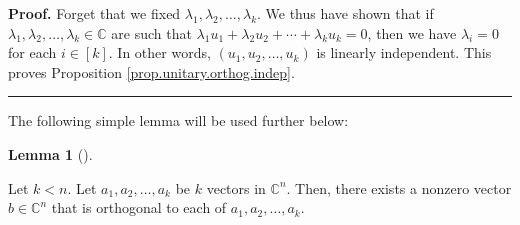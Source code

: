 \documentclass[numbers=enddot,12pt,final,onecolumn,notitlepage]{scrartcl}%
\numberwithin{exer}{subsection}
\theoremstyle{definition}
\newtheorem{lem}[theo]{Lemma}
\newenvironment{lemma}[1][]
{\begin{lem}[#1]\begin{leftbar}}
{\end{leftbar}\end{lem}}
\newenvironment{proof}[1][Proof]{\noindent\textbf{#1.} }{\ \rule{0.5em}{0.5em}}
\begin{document}
\begin{proof}
Forget that we fixed $\lambda_{1},\lambda_{2},\ldots,\lambda_{k}$. We thus
have shown that if $\lambda_{1},\lambda_{2},\ldots,\lambda_{k}\in\mathbb{C}$
are such that $\lambda_{1}u_{1}+\lambda_{2}u_{2}+\cdots+\lambda_{k}u_{k}=0$,
then we have $\lambda_{i}=0$ for each $i\in\left[  k\right]  $. In other
words, $\left(  u_{1},u_{2},\ldots,u_{k}\right)  $ is linearly independent.
This proves Proposition \ref{prop.unitary.orthog.indep}.
\end{proof}

The following simple lemma will be used further below:

\begin{lemma}
\label{lem.unitary.orthog.one-more}Let $k<n$. Let $a_{1},a_{2},\ldots,a_{k}$
be $k$ vectors in $\mathbb{C}^{n}$. Then, there exists a nonzero vector
$b\in\mathbb{C}^{n}$ that is orthogonal to each of $a_{1},a_{2},\ldots,a_{k}$.
\end{lemma}
\end{document}
